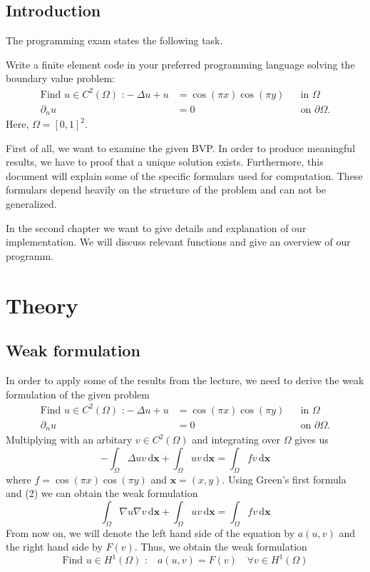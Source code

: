 \documentclass[a4paper,12pt]{report}
\begin{document}
\section{Introduction}
The programming exam states the following task.
\begin{framed}
Write a finite element code in your preferred programming language solving the boundary value problem:
\begin{align}
\mbox{Find } u\in C^2(\Omega)\mbox{ :}-\Delta u+u &= \cos(\pi x)\cos(\pi y) &&\mbox{in } \Omega \\
\partial _n u &= 0 &&\mbox{on } \partial\Omega.
\end{align}
Here, $\Omega = [0,1]^2$.
\end{framed}
First of all, we want to examine the given BVP. In order to produce meaningful results, we have to proof that a unique solution exists. Furthermore, this document will explain some of the specific formulars used for computation. These formulars depend heavily on the structure of the problem and can not be generalized.

In the second chapter we want to give details and explanation of our implementation. We will discuss relevant functions and give an overview of our programm.




\chapter[Theortical construct]{Theory} 




\newpage
\section{Weak formulation}
In order to apply some of the results from the lecture, we need to derive the weak formulation of the given problem 
\begin{align}
\mbox{Find } u\in C^2(\Omega)\mbox{ :}-\Delta u+u &= \cos(\pi x)\cos(\pi y) &&\mbox{in } \Omega \\
\partial _n u &= 0 &&\mbox{on } \partial\Omega.
\end{align}
Multiplying with an arbitary $v\in C^2(\Omega)$ and integrating over $\Omega$ gives us
\[-\int _\Omega \Delta uv \,\mbox{d} \bm{x} + \int _\Omega uv \,\mbox{d} \bm{x} = \int _ \Omega fv\,\mbox{d} \bm{x}\]
where $f=\cos(\pi x)\cos(\pi y)$ and $\bm{x}=(x,y)$. Using Green's first formula and (2) we can obtain the weak formulation
\[\int _\Omega \nabla u\nabla v \,\mbox{d} \bm{x} + \int _\Omega uv \,\mbox{d} \bm{x} = \int _ \Omega fv\,\mbox{d} \bm{x}\]
From now on, we will denote the left hand side of the equation by $a(u,v)$ and the right hand side by $F(v)$. Thus, we obtain the weak formulation
\begin{equation}
\mbox{Find }u\in H^1(\Omega) \mbox{ :} \quad a(u,v)=F(v)\quad \forall v \in H^1(\Omega)
\end{equation}
\end{document}
